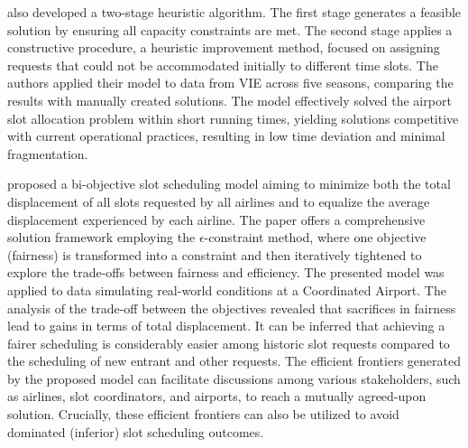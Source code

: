  also developed a two-stage heuristic
algorithm.
%
The first stage generates a feasible solution by ensuring all capacity
constraints are met.
%
The second stage applies a constructive procedure, a heuristic improvement
method, focused on assigning requests that could not be accommodated initially
to different time slots.
%
The authors applied their model to data from \acrfull{VIE} across five seasons,
comparing the results with manually created solutions.
%
The model effectively solved the airport slot allocation problem within short
running times, yielding solutions competitive with current operational
practices, resulting in low time deviation and minimal fragmentation.



 proposed a bi-objective slot scheduling
model aiming to minimize both the total displacement of all slots requested by
all airlines and to equalize the average displacement experienced by each
airline.
%
The paper offers a comprehensive solution framework employing the
$\epsilon$-constraint method, where one objective (fairness) is transformed into
a constraint and then iteratively tightened to explore the trade-offs between
fairness and efficiency.
%
The presented model was applied to data simulating real-world conditions at a
Coordinated Airport.
%
The analysis of the trade-off between the objectives revealed that sacrifices in
fairness lead to gains in terms of total displacement.
%
It can be inferred that achieving a fairer scheduling is considerably easier
among historic slot requests compared to the scheduling of new entrant and other
requests.
%
The efficient frontiers generated by the proposed model can facilitate
discussions among various stakeholders, such as airlines, slot coordinators, and
airports, to reach a mutually agreed-upon solution.
%
Crucially, these efficient frontiers can also be utilized to avoid dominated
(inferior) slot scheduling outcomes.



